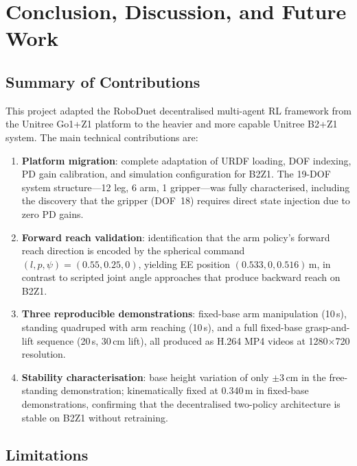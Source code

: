 
\chapter{Conclusion, Discussion, and Future Work}
\label{chp:conclusion}

\section{Summary of Contributions}

This project adapted the RoboDuet decentralised multi-agent RL framework
from the Unitree Go1+Z1 platform to the heavier and more capable Unitree
B2+Z1 system.
The main technical contributions are:

\begin{enumerate}
  \item \textbf{Platform migration}: complete adaptation of URDF loading,
        DOF indexing, PD gain calibration, and simulation configuration for
        B2Z1.  The 19-DOF system structure---12 leg, 6 arm, 1 gripper---was
        fully characterised, including the discovery that the gripper
        (DOF~18) requires direct state injection due to zero PD gains.
  \item \textbf{Forward reach validation}: identification that the arm
        policy's forward reach direction is encoded by the spherical command
        $(l, p, \psi) = (0.55, 0.25, 0)$, yielding EE position
        $(0.533, 0, 0.516)$\,m, in contrast to scripted joint angle
        approaches that produce backward reach on B2Z1.
  \item \textbf{Three reproducible demonstrations}: fixed-base arm
        manipulation (10\,s), standing quadruped with arm reaching (10\,s),
        and a full fixed-base grasp-and-lift sequence (20\,s, 30\,cm lift),
        all produced as H.264 MP4 videos at 1280$\times$720 resolution.
  \item \textbf{Stability characterisation}: base height variation of only
        $\pm$3\,cm in the free-standing demonstration; kinematically fixed
        at 0.340\,m in fixed-base demonstrations, confirming that the
        decentralised two-policy architecture is stable on B2Z1 without
        retraining.
\end{enumerate}

\section{Limitations}

